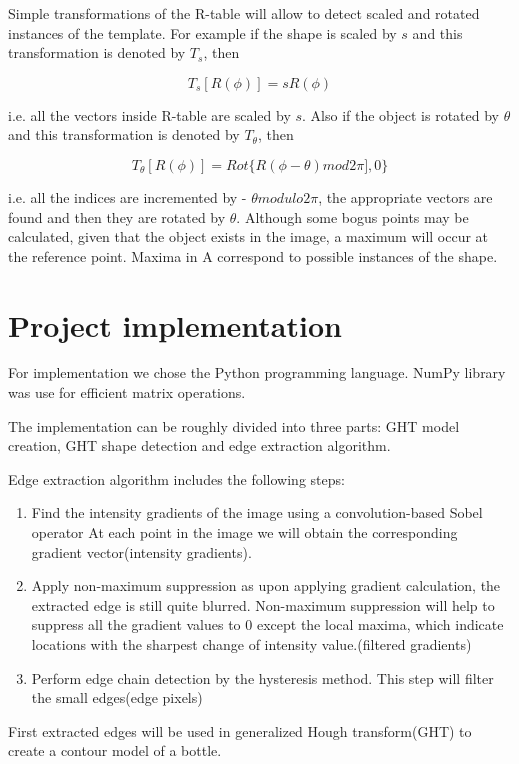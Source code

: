 \documentclass[letterpaper,12pt]{article}
\begin{document}
Simple transformations of the R-table will allow to detect scaled and rotated instances of the template. For example if the shape is scaled by $s$ and this transformation is denoted by $T_s$, then

\[T_s[R(\phi)]=sR(\phi) \]

i.e. all the vectors inside R-table are scaled by $s$. Also if the object is rotated by $\theta$ and this transformation is denoted by $T_\theta$, then

\[T_\theta[R(\phi)]=Rot\{R(\phi-\theta)mod2\pi],0\} \]

i.e. all the indices are incremented by - $\theta 
 modulo 2\pi$, the appropriate vectors are found and then they are rotated by $\theta$. 
Although some bogus points may be calculated, given that the object exists in the image, a maximum will occur at the reference point. Maxima in A correspond to possible instances of the shape.

\section{Project implementation}


For implementation we chose the Python programming language. NumPy library was use for efficient matrix operations.

The implementation can be roughly divided into three parts: GHT model creation, GHT shape detection and edge extraction algorithm.

Edge extraction algorithm includes the following steps:

\begin{enumerate}
    \item Find the intensity gradients of the image using a convolution-based Sobel operator At each point in the image we will obtain the corresponding gradient vector(intensity gradients).

    \item Apply non-maximum suppression as upon applying gradient calculation, the extracted edge is still quite blurred. Non-maximum suppression will help to suppress all the gradient values to 0 except the local maxima, which indicate locations with the sharpest change of intensity value.(filtered gradients)
	\item Perform edge chain detection by the hysteresis method. This step will filter the small edges(edge pixels) 
\end{enumerate}

First extracted edges will be used in generalized Hough transform(GHT) to create a contour model of a bottle.
\end{document}
